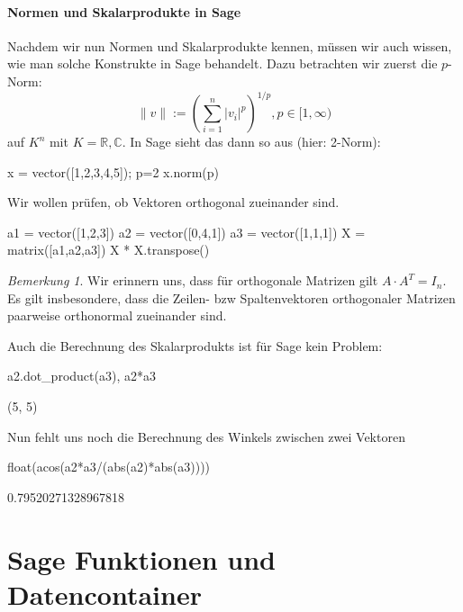 \documentclass[fontsize=12pt,paper=a4,twoside,bibtotoc,idxtotoc,
liststotoc,pagesize,BCOR1.2cm,DIV15,chapterprefix,pagesize=pdftex]{scrbook}
\theoremstyle{plain}
\theoremstyle{definition}
\theoremstyle{remark}
\newtheorem{bem}[equation]{Bemerkung}
\begin{document}
\subsubsection{Normen und Skalarprodukte in Sage}
Nachdem wir nun Normen und Skalarprodukte kennen, müssen wir auch wissen, wie man solche Konstrukte in Sage behandelt. Dazu betrachten wir zuerst die $p$-Norm:
\[
\|v\|:=(\sum_{i=1}^n |v_i|^p)^{1/p}, p\in [1,\infty)                   
\]
auf $K^n$ mit $K=\mathbb{R},\mathbb{C}$. In Sage sieht das dann so aus (hier: 2-Norm):
\begin{sagein}
x = vector([1,2,3,4,5]); p=2
x.norm(p)
\end{sagein}
Wir wollen prüfen, ob Vektoren orthogonal zueinander sind.
\begin{sagein}
a1 = vector([1,2,3])
a2 = vector([0,4,1])
a3 = vector([1,1,1])
X = matrix([a1,a2,a3])
X * X.transpose() 
\end{sagein}
\begin{bem}
 Wir erinnern uns, dass für orthogonale Matrizen gilt $A\cdot A^T=I_n$. Es gilt insbesondere, dass die Zeilen- bzw Spaltenvektoren orthogonaler Matrizen paarweise 
orthonormal zueinander sind.
\end{bem}
Auch die Berechnung des Skalarprodukts ist für Sage kein Problem:
\begin{sagein}
a2.dot_product(a3), a2*a3
\end{sagein}
\begin{sage}
  (5, 5)
\end{sage}
Nun fehlt uns noch die Berechnung des Winkels zwischen zwei Vektoren
\begin{sagein}
float(acos(a2*a3/(abs(a2)*abs(a3))))
\end{sagein}
\begin{sage}
  0.79520271328967818
\end{sage}


\chapter{Sage Funktionen und Datencontainer}
\end{document}
